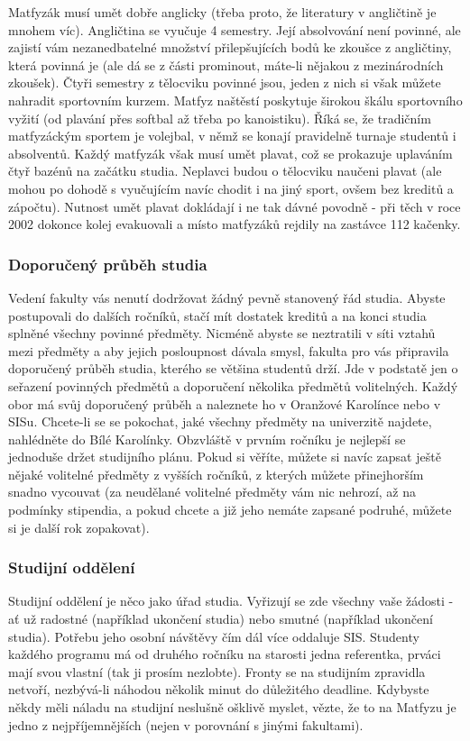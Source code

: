 Matfyzák musí umět dobře anglicky (třeba proto, že literatury v angličtině je
mnohem víc). Angličtina se vyučuje 4 semestry. Její absolvování není povinné,
ale zajistí vám nezanedbatelné množství přilepšujících bodů ke zkoušce z
angličtiny, která povinná je (ale dá se z části prominout, máte-li nějakou z
mezinárodních zkoušek).
Čtyři semestry z tělocviku povinné jsou, jeden z nich si však můžete nahradit
sportovním kurzem. Matfyz naštěstí poskytuje širokou škálu sportovního vyžití
(od plavání přes softbal až třeba po kanoistiku). Říká se, že tradičním
matfyzáckým sportem je volejbal, v němž se konají pravidelně turnaje studentů i
absolventů.
Každý matfyzák však musí umět plavat, což se prokazuje uplaváním čtyř bazénů na
začátku studia. Neplavci budou o tělocviku naučeni plavat (ale mohou po dohodě s
vyučujícím navíc chodit i na jiný sport, ovšem bez kreditů a zápočtu). Nutnost
umět plavat dokládají i ne tak dávné povodně - při těch v roce 2002 dokonce
kolej evakuovali a místo matfyzáků rejdily na zastávce 112 kačenky.


\subsubsection{Doporučený průběh studia}
Vedení fakulty vás nenutí dodržovat žádný pevně stanovený řád studia. Abyste
postupovali do dalších ročníků, stačí mít dostatek kreditů a na konci studia
splněné všechny povinné předměty. Nicméně abyste se neztratili v síti vztahů
mezi předměty a aby jejich posloupnost dávala smysl, fakulta pro vás připravila
doporučený průběh studia, kterého se většina studentů drží. Jde v podstatě jen o
seřazení povinných předmětů a doporučení několika předmětů volitelných. Každý
obor má svůj doporučený průběh a naleznete ho v Oranžové Karolínce nebo v SISu.
Chcete-li se se pokochat, jaké všechny předměty na univerzitě najdete,
nahlédněte do Bílé Karolínky.
Obzvláště v prvním ročníku je nejlepší se jednoduše držet studijního plánu.
Pokud si věříte, můžete si navíc zapsat ještě nějaké volitelné předměty z
vyšších ročníků, z kterých můžete přinejhorším snadno vycouvat (za neudělané
volitelné předměty vám nic nehrozí, až na podmínky stipendia, a pokud chcete a
již jeho nemáte zapsané podruhé, můžete si je další rok zopakovat).


\subsubsection{Studijní oddělení}
Studijní oddělení je něco jako úřad studia. Vyřizují se zde všechny vaše žádosti
- ať už radostné (například ukončení studia) nebo smutné (například ukončení
studia). Potřebu jeho osobní návštěvy čím dál více oddaluje SIS. Studenty
každého programu má od druhého ročníku na starosti jedna referentka, prváci mají
svou vlastní (tak ji prosím nezlobte).
Fronty se na studijním zpravidla netvoří, nezbývá-li náhodou několik minut do
důležitého deadline. Kdybyste někdy měli náladu na studijní neslušně ošklivě
myslet, vězte, že to na Matfyzu je jedno z nejpříjemnějších (nejen v porovnání s
jinými fakultami).


